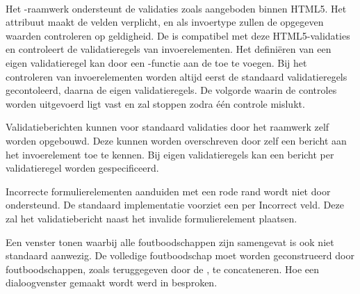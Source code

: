 \paragraph{\kendo}
Het \kendo{}-raamwerk ondersteunt de validaties zoals aangeboden binnen HTML5.
Het  attribuut maakt de velden verplicht,  en  als invoertype zullen de opgegeven waarden controleren op geldigheid.
De \kendo{}  is compatibel met deze HTML5-validaties en controleert de validatieregels van invoerelementen.
Het definiëren van een eigen validatieregel kan door een \js-functie aan de  toe te voegen.
Bij het controleren van invoerelementen worden altijd eerst de standaard validatieregels gecontoleerd,  daarna de eigen validatieregels.
De volgorde waarin de controles worden uitgevoerd ligt vast en zal stoppen zodra één controle mislukt.

Validatieberichten kunnen voor standaard validaties door het raamwerk zelf worden opgebouwd.
Deze kunnen worden overschreven door zelf een bericht aan het invoerelement toe te kennen.
Bij eigen validatieregels kan een bericht per validatieregel worden gespecificeerd.

Incorrecte formulierelementen aanduiden met een rode rand wordt niet door \kendo{} ondersteund.
De standaard implementatie voorziet een  per Incorrect veld.
Deze zal het validatiebericht naast het invalide formulierelement plaatsen. 

Een venster tonen waarbij alle foutboodschappen zijn samengevat is ook niet standaard aanwezig.
De volledige foutboodschap moet worden geconstrueerd door foutboodschappen,  zoals teruggegeven door de , te concateneren.
Hoe een dialoogvenster gemaakt wordt werd in  besproken.

